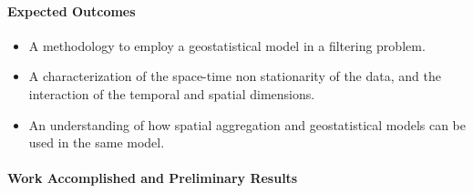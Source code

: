 \paragraph{Expected Outcomes}

\begin{itemize}
  \item A methodology to employ a geostatistical model in a filtering problem.
  \item A characterization of the space-time non stationarity of the data, and the interaction of the temporal and spatial dimensions.
  \item An understanding of how spatial aggregation and geostatistical models can be used in the same model. 
\end{itemize}

\paragraph{Work Accomplished and Preliminary Results}


